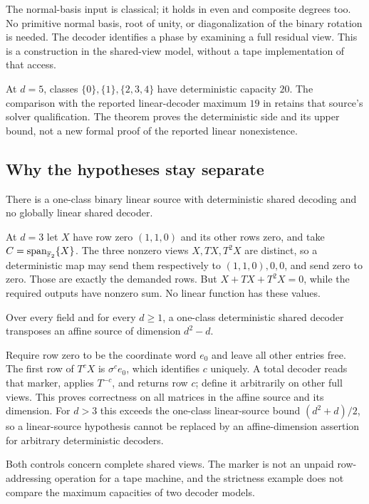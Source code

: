 The normal-basis input is classical; it holds in even and composite
degrees too. No primitive normal basis, root of unity, or diagonalization
of the binary rotation is needed. The decoder identifies a phase by
examining a full residual view. This is a construction in the shared-view
model, without a tape implementation of that access.

At $d=5$, classes $\{0\},\{1\},\{2,3,4\}$ have deterministic capacity
$20$. The comparison with the reported linear-decoder maximum $19$
in \cite{SeventeenthPaper2026} retains that source's solver qualification.
The theorem proves the deterministic side and its upper bound, not a new
formal proof of the reported linear nonexistence.

\subsection{Why the hypotheses stay separate}

\begin{proposition}\label{prop:strict-decoder}
There is a one-class binary linear source with deterministic shared
decoding and no globally linear shared decoder.
\end{proposition}
\begin{outline}
At $d=3$ let $X$ have row zero $(1,1,0)$ and its other rows zero, and take
$C=\operatorname{span}_{\mathbb{F}_2}\{X\}$. The three nonzero views
$X,TX,T^2X$ are distinct, so a deterministic map may send them respectively
to $(1,1,0),0,0$, and send zero to zero. Those are exactly the demanded
rows. But $X+TX+T^2X=0$, while the required outputs have nonzero sum.
No linear function has these values.
\end{outline}

\begin{proposition}\label{prop:affine-marker}
Over every field and for every $d\ge1$, a one-class deterministic shared
decoder transposes an affine source of dimension $d^2-d$.
\end{proposition}
\begin{outline}
Require row zero to be the coordinate word $e_0$ and leave all other
entries free. The first row of $T^cX$ is $\sigma^ce_0$, which identifies
$c$ uniquely. A total decoder reads that marker, applies $T^{-c}$, and
returns row $c$; define it arbitrarily on other full views. This proves
correctness on all matrices in the affine source and its dimension.
For $d>3$ this exceeds the one-class linear-source bound
$(d^2+d)/2$, so a linear-source hypothesis cannot be replaced by an
affine-dimension assertion for arbitrary deterministic decoders.
\end{outline}

Both controls concern complete shared views. The marker is not an
unpaid row-addressing operation for a tape machine, and the strictness
example does not compare the maximum capacities of two decoder models.
